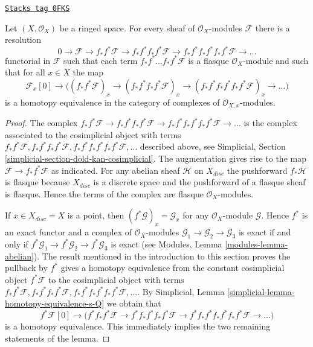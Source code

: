 \begin{lemma}
\label{cohomology-lemma-godement-resolution}
\href{https://stacks.math.columbia.edu/tag/0FKS}{\texttt{Stacks tag 0FKS}}

Let $(X, \mathcal{O}_X)$ be a ringed space. For every sheaf of
$\mathcal{O}_X$-modules $\mathcal{F}$ there is a resolution
$$
0 \to
\mathcal{F} \to
f_*f^*\mathcal{F} \to
f_*f^*f_*f^*\mathcal{F} \to
f_*f^*f_*f^*f_*f^*\mathcal{F} \to \ldots
$$
functorial in $\mathcal{F}$ such that each term
$f_*f^* \ldots f_*f^*\mathcal{F}$ is a flasque
$\mathcal{O}_X$-module and such that for all $x \in X$ the
map
$$
\mathcal{F}_x[0] \to \Big(
(f_*f^*\mathcal{F})_x \to
(f_*f^*f_*f^*\mathcal{F})_x \to
(f_*f^*f_*f^*f_*f^*\mathcal{F})_x \to \ldots
\Big)
$$
is a homotopy equivalence in the category of complexes
of $\mathcal{O}_{X, x}$-modules.
\end{lemma}

\begin{proof}
The complex $f_*f^*\mathcal{F} \to  f_*f^*f_*f^*\mathcal{F} \to
f_*f^*f_*f^*f_*f^*\mathcal{F} \to \ldots$ is the complex associated
to the cosimplicial object with terms
$f_*f^*\mathcal{F}, f_*f^*f_*f^*\mathcal{F},
f_*f^*f_*f^*f_*f^*\mathcal{F}, \ldots$ described above, see
Simplicial, Section \ref{simplicial-section-dold-kan-cosimplicial}.
The augmentation gives rise to the map $\mathcal{F} \to f_*f^*\mathcal{F}$
as indicated. For any abelian sheaf $\mathcal{H}$ on $X_{disc}$ the
pushforward $f_*\mathcal{H}$ is flasque because $X_{disc}$
is a discrete space and the pushforward of a flasque sheaf is flasque.
Hence the terms of the complex are flasque $\mathcal{O}_X$-modules.

\medskip\noindent
If $x \in X_{disc} = X$ is a point, then $(f^*\mathcal{G})_x = \mathcal{G}_x$
for any $\mathcal{O}_X$-module $\mathcal{G}$. Hence $f^*$ is an exact functor
and a complex of $\mathcal{O}_X$-modules
$\mathcal{G}_1 \to \mathcal{G}_2 \to \mathcal{G}_3$
is exact if and only if
$f^*\mathcal{G}_1 \to f^*\mathcal{G}_2 \to f^*\mathcal{G}_3$
is exact (see Modules, Lemma \ref{modules-lemma-abelian}).
The result mentioned in the introduction to this section
proves the pullback by $f^*$ gives a homotopy equivalence from
the constant cosimplicial object $f^*\mathcal{F}$ to the
cosimplicial object with terms
$f_*f^*\mathcal{F}, f_*f^*f_*f^*\mathcal{F},
f_*f^*f_*f^*f_*f^*\mathcal{F}, \ldots$.
By Simplicial, Lemma \ref{simplicial-lemma-homotopy-equivalence-s-Q}
we obtain that
$$
f^*\mathcal{F}[0] \to \Big(
f^*f_*f^*\mathcal{F} \to
f^*f_*f^*f_*f^*\mathcal{F} \to
f^*f_*f^*f_*f^*f_*f^*\mathcal{F} \to \ldots
\Big)
$$
is a homotopy equivalence. This immediately implies the two remaining
statements of the lemma.
\end{proof}

